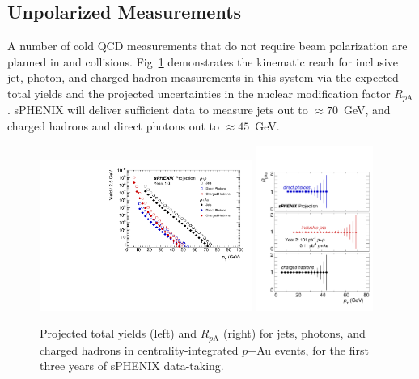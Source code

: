 \subsection {Unpolarized Measurements}

A number of cold QCD measurements that do not require beam
polarization are planned in \pp and \pA collisions. Fig~\ref{fig:jet_RpA_proj} demonstrates the kinematic reach for inclusive jet, photon, and charged hadron measurements in this system via the expected total yields and the projected uncertainties in the nuclear modification factor $R_{p\mathrm{A}}$. sPHENIX will deliver sufficient data to measure jets out to $\approx 70$~GeV, and charged hadrons and direct photons out to $\approx 45$~GeV.

\begin{figure}[t]
\centering
\includegraphics[width=0.62\textwidth]{figs/master_Years13_pA_yields.pdf}
\includegraphics[width=0.34\textwidth]{figs/RpA.pdf}
\caption{Projected total yields (left) and $R_{p\mathrm{A}}$ (right) for jets, photons, and charged hadrons in centrality-integrated $p$+Au events, for the first three years of sPHENIX data-taking.}
\label{fig:jet_RpA_proj}
\end{figure}

